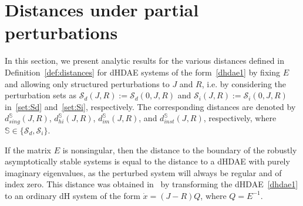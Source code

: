 \documentclass[11pt]{article}
\begin{document}
\section{Distances under  partial perturbations}\label{sec:partial}
In this section, we present analytic results for the various distances defined in Definition~\ref{def:distances} for dHDAE systems of the form~\eqref{dhdae1} by fixing $E$ and allowing only structured perturbations to $J$ and $R$, i.e. by considering the perturbation sets  as $\mathcal S_d(J,R):=\mathcal S_d(0,J,R)$
and $\mathcal S_i(J,R):=\mathcal S_i(0,J,R)$ in~\eqref{set:Sd} and~\eqref{set:Si}, respectively. The corresponding distances are denoted by $d_{sing}^{\mathbb S}(J,R)$, $d_{hi}^{\mathbb S}(J,R)$, $d_{im}^{\mathbb S}(J,R)$, and $d_{inst}^{\mathbb S}(J,R)$,
respectively, where $\mathbb S\in \{\mathcal S_d,\mathcal S_i\}$.


If the matrix $E$ is nonsingular, then the distance to the boundary of the robustly asymptotically stable systems is equal to the distance to a dHDAE with purely imaginary eigenvalues, as the perturbed system will always be regular and of index zero. This distance was obtained in~\cite{BenMPS25} by transforming the dHDAE~\eqref{dhdae1} to an ordinary dH system of the form $\dot{x}=(J-R)Q$, where $Q=E^{-1}$.
\end{document}
